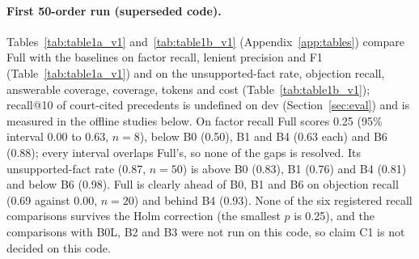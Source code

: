 \paragraph{First 50-order run (superseded code).} Tables~\ref{tab:table1a_v1} and~\ref{tab:table1b_v1} (Appendix~\ref{app:tables}) compare Full with the baselines on factor recall, lenient precision and F1 (Table~\ref{tab:table1a_v1}) and on the unsupported-fact rate, objection recall, answerable coverage, coverage, tokens and cost (Table~\ref{tab:table1b_v1}); recall@10 of court-cited precedents is undefined on dev (Section~\ref{sec:eval}) and is measured in the offline studies below. On factor recall Full scores 0.25 (95\% interval 0.00 to 0.63, $n=8$), below B0 (0.50), B1 and B4 (0.63 each) and B6 (0.88); every interval overlaps Full's, so none of the gaps is resolved. Its unsupported-fact rate (0.87, $n=50$) is above B0 (0.83), B1 (0.76) and B4 (0.81) and below B6 (0.98). Full is clearly ahead of B0, B1 and B6 on objection recall (0.69 against 0.00, $n=20$) and behind B4 (0.93). None of the six registered recall comparisons survives the Holm correction (the smallest $p$ is 0.25), and the comparisons with B0L, B2 and B3 were not run on this code, so claim C1 is not decided on this code.


